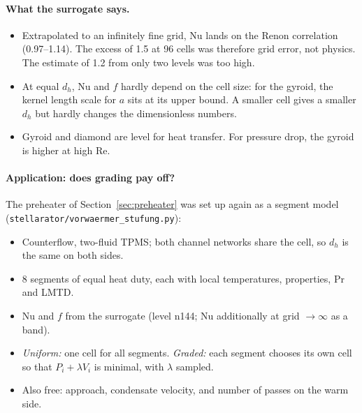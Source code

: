 

\paragraph{What the surrogate says.}
\begin{itemize}
\item Extrapolated to an infinitely fine grid, Nu lands on the Renon correlation (0.97--1.14). The excess of 1.5 at 96
  cells was therefore grid error, not physics. The estimate of 1.2 from only two levels was too high.
\item At equal $d_h$, Nu and $f$ hardly depend on the cell size: for the gyroid, the kernel length scale for $a$ sits at
  its upper bound. A smaller cell gives a smaller $d_h$ but hardly changes the dimensionless numbers.
\item Gyroid and diamond are level for heat transfer. For pressure drop, the gyroid is higher at high Re.
\end{itemize}

\paragraph{Application: does grading pay off?} The preheater of Section~\ref{sec:preheater} was set up again as a
segment model (\texttt{stellarator/vorwaermer\_stufung.py}):
\begin{itemize}
\item Counterflow, two-fluid TPMS; both channel networks share the cell, so $d_h$ is the same on both sides.
\item 8 segments of equal heat duty, each with local temperatures, properties, Pr and LMTD.
\item Nu and $f$ from the surrogate (level n144; Nu additionally at grid $\to\infty$ as a band).
\item \emph{Uniform:} one cell for all segments. \emph{Graded:} each segment chooses its own cell so that
  $P_i + \lambda V_i$ is minimal, with $\lambda$ sampled.
\item Also free: approach, condensate velocity, and number of passes on the warm side.
\end{itemize}

